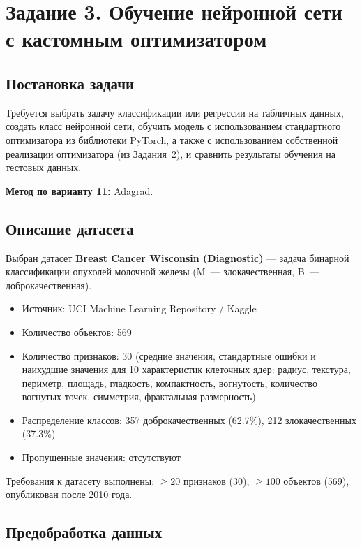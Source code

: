 \section{Задание 3. Обучение нейронной сети с кастомным оптимизатором}

\subsection{Постановка задачи}

Требуется выбрать задачу классификации или регрессии на табличных данных,
создать класс нейронной сети, обучить модель с использованием стандартного
оптимизатора из библиотеки PyTorch, а также с использованием собственной
реализации оптимизатора (из Задания~2), и сравнить результаты обучения
на тестовых данных.

\textbf{Метод по варианту 11:} Adagrad.

\subsection{Описание датасета}

Выбран датасет \textbf{Breast Cancer Wisconsin (Diagnostic)} — задача
бинарной классификации опухолей молочной железы (M~--- злокачественная,
B~--- доброкачественная).

\begin{itemize}
    \item Источник: UCI Machine Learning Repository / Kaggle
    \item Количество объектов: 569
    \item Количество признаков: 30 (средние значения, стандартные ошибки
          и наихудшие значения для 10 характеристик клеточных ядер:
          радиус, текстура, периметр, площадь, гладкость, компактность,
          вогнутость, количество вогнутых точек, симметрия, фрактальная размерность)
    \item Распределение классов: 357 доброкачественных (62.7\%), 212 злокачественных (37.3\%)
    \item Пропущенные значения: отсутствуют
\end{itemize}

Требования к датасету выполнены: $\ge 20$ признаков (30), $\ge 100$ объектов (569),
опубликован после 2010 года.

\subsection{Предобработка данных}

